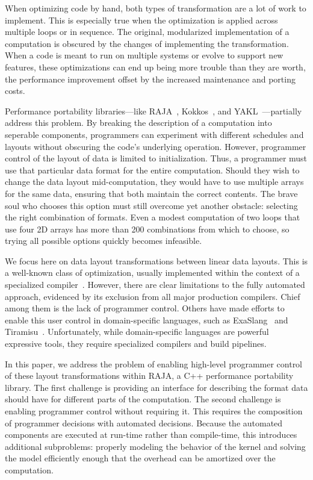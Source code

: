 \documentclass[sigconf,review=true]{acmart}
\begin{document}
When optimizing code by hand, both types of transformation are a lot of work to implement. 
This is especially true when the optimization is applied across multiple loops or in sequence.
The original, modularized implementation of a computation is obscured by the changes of implementing the transformation. 
When a code is meant to run on multiple systems or evolve to support new features, these optimizations can end up being more trouble than they are worth, the performance improvement offset by the increased maintenance and porting costs.

Performance portability libraries---like RAJA~\cite{hornung2014RAJA}, Kokkos~\cite{edwards2014kokkos}, and YAKL~\cite{norman2022portable}---partially address this problem.
By breaking the description of a computation into seperable components, programmers can experiment with different schedules and layouts without obscuring the code's underlying operation.
However, programmer control of the layout of data is limited to initialization. 
Thus, a programmer must use that particular data format for the entire computation.
Should they wish to change the data layout mid-computation, they would have to use multiple arrays for the same data, ensuring that both maintain the correct contents.
The brave soul who chooses this option must still overcome yet another obstacle: selecting the right combination of formats.
Even a modest computation of two loops that use four 2D arrays has more than 200 combinations from which to choose, so trying all possible options quickly becomes infeasible. 

We focus here on data layout transformations between linear data layouts.
This is a well-known class of optimization, usually implemented within the context of a specialized compiler~\cite{bixby1994automatic,kennedy1995automatic,kennedy1998automatic,chen2004ilp,chen2005constraint,chen2005integrating, ozturk2011data}.
However, there are clear limitations to the fully automated approach, evidenced by its exclusion from all major production compilers.
Chief among them is the lack of programmer control.
Others have made efforts to enable this user control in domain-specific languages, such as ExaSlang~\cite{kronawitter2018automatic} and Tiramisu~\cite{baghdadi2019tiramisu}.
Unfortunately, while domain-specific languages are powerful expressive tools, they require specialized compilers and build pipelines. 

In this paper, we address the problem of enabling high-level programmer control of these layout transformations within RAJA, a C++ performance portability library.
The first challenge is providing an interface for describing the format data should have for different parts of the computation.
The second challenge is enabling programmer control without requiring it.
This requires the composition of programmer decisions with automated decisions.
Because the automated components are executed at run-time rather than compile-time, this introduces additional subproblems: properly modeling the behavior of the kernel and solving the model efficiently enough that the overhead can be amortized over the computation.
\end{document}
